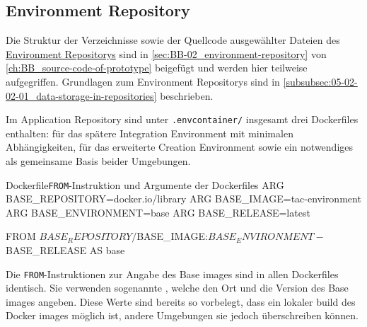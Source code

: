 
\subsection{Environment Repository}
\label{subsec:06-02-02_environment-repository}

Die Struktur der Verzeichnisse sowie der Quellcode ausgewählter Dateien des \hyperref[sec:BB-02_environment-repository]{Environment Repositorys} sind in \autoref{sec:BB-02_environment-repository} von \autoref{ch:BB_source-code-of-prototype} beigefügt und werden hier teilweise aufgegriffen. Grundlagen zum Environment Repositorys sind in \autoref{subsubsec:05-02-02-01_data-storage-in-repositories} beschrieben.

Im Application Repository sind unter \texttt{.envcontainer/} insgesamt drei Dockerfiles enthalten:  für das spätere Integration Environment mit minimalen Abhängigkeiten,  für das erweiterte Creation Environment sowie ein notwendiges  als gemeinsame Basis beider Umgebungen.

\begin{codebox}{Dockerfile}{\texttt{FROM}-Instruktion und Argumente der Dockerfiles}
ARG BASE_REPOSITORY=docker.io/library
ARG BASE_IMAGE=tac-environment
ARG BASE_ENVIRONMENT=base
ARG BASE_RELEASE=latest

FROM ${BASE_REPOSITORY}/${BASE_IMAGE}:${BASE_ENVIRONMENT}-${BASE_RELEASE} AS base
\end{codebox}

Die \texttt{FROM}-Instruktionen zur Angabe des Base \Glspl{image} sind in allen Dockerfiles identisch. Sie verwenden sogenannte , welche den Ort und die Version des Base \Glspl{image} angeben. Diese Werte sind bereits so vorbelegt, dass ein lokaler \Gls{build} des Docker \Glspl{image} möglich ist, andere Umgebungen sie jedoch überschreiben können.

